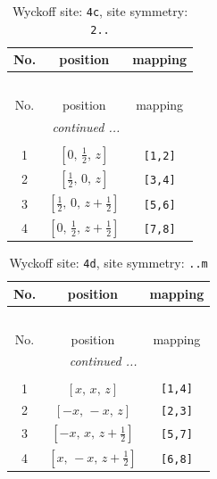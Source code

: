 \documentclass[fleqn,8pt]{jsarticle}
\begin{document}
\renewcommand{\arraystretch}{1.2}
\begin{longtable}{ccc}
\caption{Wyckoff site: {\tt 4c}, site symmetry: {\tt 2..}}
 \\
 \hline \hline
No. & position & mapping \\ \hline \endfirsthead

\multicolumn{2}{l}{\tablename\ \thetable{}} \\
 \hline \hline
No. & position & mapping \\ \hline \endhead

 \hline \hline
\multicolumn{2}{r}{\footnotesize\it continued ...} \\ \endfoot

 \hline \hline
\multicolumn{2}{r}{} \\ \endlastfoot

1 & $\left[ 0,\, \frac{1}{2},\, z \right]$ & {\tt [1,2]} \\ \hline
2 & $\left[ \frac{1}{2},\, 0,\, z \right]$ & {\tt [3,4]} \\ \hline
3 & $\left[ \frac{1}{2},\, 0,\, z + \frac{1}{2} \right]$ & {\tt [5,6]} \\ \hline
4 & $\left[ 0,\, \frac{1}{2},\, z + \frac{1}{2} \right]$ & {\tt [7,8]} \\
\end{longtable}
\renewcommand{\arraystretch}{1.2}
\begin{longtable}{ccc}
\caption{Wyckoff site: {\tt 4d}, site symmetry: {\tt ..m}}
 \\
 \hline \hline
No. & position & mapping \\ \hline \endfirsthead

\multicolumn{2}{l}{\tablename\ \thetable{}} \\
 \hline \hline
No. & position & mapping \\ \hline \endhead

 \hline \hline
\multicolumn{2}{r}{\footnotesize\it continued ...} \\ \endfoot

 \hline \hline
\multicolumn{2}{r}{} \\ \endlastfoot

1 & $\left[ x,\, x,\, z \right]$ & {\tt [1,4]} \\ \hline
2 & $\left[ - x,\, - x,\, z \right]$ & {\tt [2,3]} \\ \hline
3 & $\left[ - x,\, x,\, z + \frac{1}{2} \right]$ & {\tt [5,7]} \\ \hline
4 & $\left[ x,\, - x,\, z + \frac{1}{2} \right]$ & {\tt [6,8]} \\
\end{longtable}
\end{document}
